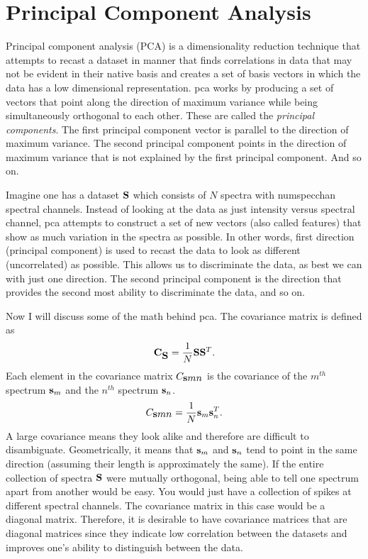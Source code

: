 \section{Principal Component Analysis}

Principal component analysis (PCA) is a dimensionality reduction technique that attempts to recast a dataset in manner that finds correlations in data that may not be evident in their native basis and creates a set of basis vectors in which the data has a low dimensional representation. \Gls{pca} works by producing a set of vectors that point along the direction of maximum variance while being simultaneously orthogonal to each other. These are called the \emph{principal components}. The first principal component vector is parallel to the direction of maximum variance. The second principal component points in the direction of maximum variance that is not explained by the first principal component. And so on. 

Imagine one has a dataset $\displaystyle \mathbf{S}$ which consists of $N$ spectra with \gls{numspecchan} spectral channels. Instead of looking at the data as just intensity versus spectral channel, \gls{pca} attempts to construct a set of new vectors (also called features) that show as much variation in the spectra as possible. In other words, first direction (principal component) is used to recast the data to look as different (uncorrelated) as possible. This allows us to discriminate the data, as best we can with just one direction. The second principal component is the direction that provides the second most ability to discriminate the data, and so on. 

Now I will discuss some of the math behind \gls{pca}. The covariance matrix is defined as
\begin{equation}
\displaystyle \mathbf{C_{\displaystyle \mathbf{S}}} = \frac{1}{N} \displaystyle \mathbf{S} \displaystyle \mathbf{S}^{T}.
\end{equation}
%
Each element in the covariance matrix $C_{\displaystyle \mathbf{s}mn}$ is the covariance of the $m^{th}$ spectrum $\displaystyle \mathbf{s}_m$ and the $n^{th}$ spectrum $\displaystyle \mathbf{s}_n$. 
%
\begin{equation}
C_{\displaystyle \mathbf{s}mn} = \frac{1}{N} \displaystyle \mathbf{s}_m \displaystyle \mathbf{s}_n^{T}.
\end{equation}
%
A large covariance means they look alike and therefore are difficult to disambiguate. Geometrically, it means that $\displaystyle \mathbf{s}_m$ and $\displaystyle \mathbf{s}_n$ tend to point in the same direction (assuming their length is approximately the same). If the entire collection of spectra $\displaystyle \mathbf{S}$ were mutually orthogonal, being able to tell one spectrum apart from another would be easy. You would just have a collection of spikes at different spectral channels. The covariance matrix in this case would be a diagonal matrix. Therefore, it is desirable to have covariance matrices that are diagonal matrices since they indicate low correlation between the datasets and improves one's ability to distinguish between the data.

